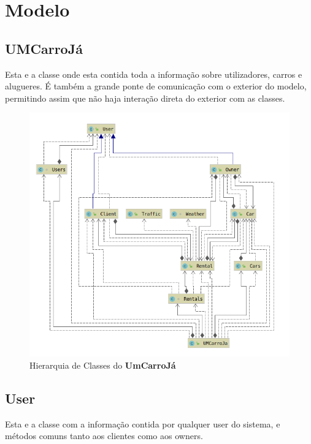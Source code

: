 \documentclass[a4paper]{report}
\begin{document}
\section{Modelo}

\subsection{UMCarroJá}

Esta e a classe onde esta contida toda a informação sobre utilizadores,
carros e alugueres. É também a grande ponte de comunicação com o exterior
do modelo, permitindo assim que não haja interação direta do exterior com
as classes.

\begin{figure}[h]
    \centering
    \includegraphics[scale=0.5]{hierarquiaUmCarroJa.png}
    \caption{Hierarquia de Classes do \textbf{UmCarroJá}}\label{fig:hUCJ}
\end{figure}


\subsection{User}

Esta e a classe com a informação contida por qualquer user do sistema,
e métodos comuns tanto aos clientes como aos owners.
\end{document}
